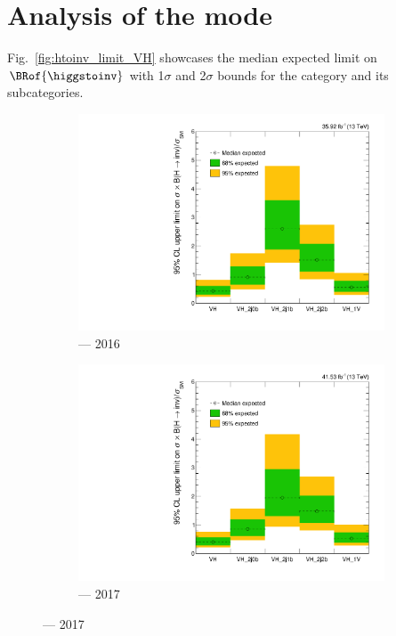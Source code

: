 

\section{Analysis of the \texorpdfstring{\VH}{VH} mode}
\label{sec:htoinv_analysis_VH}


Fig.~\ref{fig:htoinv_limit_VH} showcases the median expected limit on $\BRof{\higgstoinv}$ with 1$\sigma$ and 2$\sigma$ bounds for the \VH category and its subcategories.

\begin{figure}[htbp]
    \centering
    \begin{subfigure}[b]{0.45\textwidth}
        \includegraphics[width=\textwidth]{figures/limits/VH/limit_2016_VH_Scenario5.pdf}
        \caption{\VH --- 2016}
    \end{subfigure}
    \hfill
    \begin{subfigure}[b]{0.45\textwidth}
        \includegraphics[width=\textwidth]{figures/limits/VH/limit_2017_VH_Scenario5.pdf}
        \caption{\VH --- 2017}
    \end{subfigure}


\end{figure}
